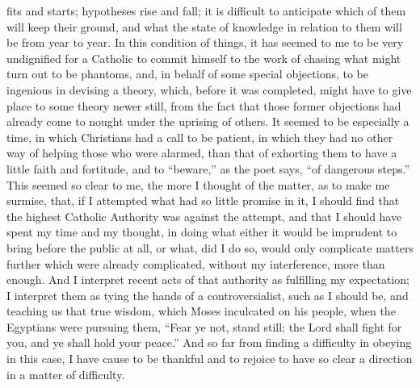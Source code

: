 fits and starts; hypotheses rise and fall; it is difficult to anticipate
which of them will keep their ground, and what the state of
knowledge in relation to them will be from year to year. In this
condition of things, it has seemed to me to be very undignified for a
Catholic to commit himself to the work of chasing what might turn out to
be phantoms, and, in behalf of some special objections, to be ingenious
in devising a theory, which, before it was completed, might have
to give place to some theory newer still, from the fact that those
former objections had already come to nought under the uprising of
others. It seemed to be especially a time, in
which Christians had a call to be patient, in which they had no other
way of helping those who were alarmed, than that of exhorting them to
have a little faith and fortitude, and to ``beware,'' as the
poet says, ``of dangerous steps.'' This seemed so clear to me,
the more I thought of the matter, as to make me
surmise, that, if I attempted what had so little promise in it, I should
find that the highest Catholic Authority was against the
attempt, and that I should have spent my time and my thought, in doing
what either it would be imprudent to bring before the public at all, or
what, did I do so, would only complicate matters further which
were already complicated, without my interference, more than
enough. And I interpret recent acts of that authority as fulfilling my
expectation; I interpret them as tying the hands of a controversialist,
such as I should be, and teaching us that true wisdom, which Moses
inculcated on his people, when the Egyptians were pursuing them,
``Fear ye not, stand still; the Lord shall fight for you, and ye
shall hold your peace.'' And so far from finding a difficulty in
obeying in this case, I have cause to be thankful and to rejoice to have
so clear a direction in a matter of difficulty.

